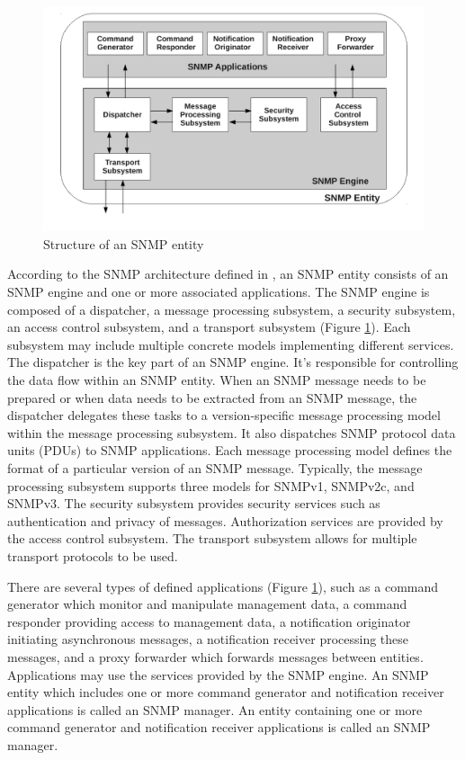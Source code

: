\begin{figure}[htp]	
\begin{center}
    \includegraphics[scale = 0.6]{img/snmp-arch.pdf}
    \caption{Structure of an SNMP entity}   
	\label{fig:snmparch}
\end{center}
\end{figure}

According to the SNMP architecture defined in \cite{rfc3411}, an SNMP entity consists of an SNMP engine and one or more associated applications. The SNMP engine is composed of a dispatcher, a message processing subsystem, a security subsystem, an access control subsystem, and a transport subsystem (Figure \ref{fig:snmparch}). Each subsystem may include multiple concrete models implementing different services. The dispatcher is the key part of an SNMP engine. It's responsible for controlling the data flow within an SNMP entity. When an SNMP message needs to be prepared or when data needs to be extracted from an SNMP message, the dispatcher delegates these tasks to a version-specific message processing model within the message processing subsystem. It also dispatches SNMP  protocol data units (PDUs) to SNMP applications. Each message processing model defines the format of a particular version of an SNMP message. Typically, the message processing subsystem supports three models for SNMPv1, SNMPv2c, and SNMPv3. The security subsystem provides security services such as authentication and privacy of messages. Authorization services are provided by the access control subsystem. The transport subsystem \cite{rfc5590} allows for multiple transport protocols to be used.

There are several types of defined applications (Figure \ref{fig:snmparch}), such as a command generator which monitor and manipulate management data, a command responder providing access to management data, a notification originator initiating asynchronous messages, a notification receiver processing these messages, and a proxy forwarder which forwards messages between entities. Applications may use the services provided by the SNMP engine. An SNMP entity which includes one or more command generator and notification receiver applications is called an SNMP manager. An entity containing one or more command generator and notification receiver applications is called an SNMP manager.


